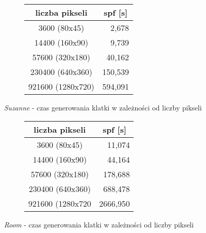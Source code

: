 \begin{figure}[H]
\begin{subfigure}{.5\textwidth}
\end{subfigure}
\begin{subfigure}{.5\textwidth}
		\caption{Tabla z wynikami}
		\begin{longtable}{|c|r|} \hline
	    liczba pikseli & \multicolumn{1}{|c|}{spf [s]} \\ \hline
	    3600 (80x45) & 2,678 \\ 
	    14400 (160x90) & 9,739 \\
		57600 (320x180) & 40,162 \\
		230400 (640x360) & 150,539 \\
		921600 (1280x720) & 594,091 \\
		\hline
		\end{longtable}
\end{subfigure}
\caption{\emph{Suzanne} - czas generowania klatki w zależności od liczby pikseli}
\end{figure}
\begin{figure}[H]
\begin{subfigure}{.5\textwidth}
\end{subfigure}
\begin{subfigure}{.5\textwidth}
		\caption{Tabla z wynikami}
		\begin{longtable}{|c|r|} \hline
	    liczba pikseli & \multicolumn{1}{|c|}{spf [s]} \\ \hline
	    3600 (80x45) & 11,074 \\ 
	    14400 (160x90) & 44,164 \\
		57600 (320x180) & 178,688 \\
		230400 (640x360) & 688,478 \\
		921600 (1280x720 & 2666,950 \\
		\hline
		\end{longtable}
\end{subfigure}
\caption{\emph{Room} - czas generowania klatki w zależności od liczby pikseli}
\end{figure}

